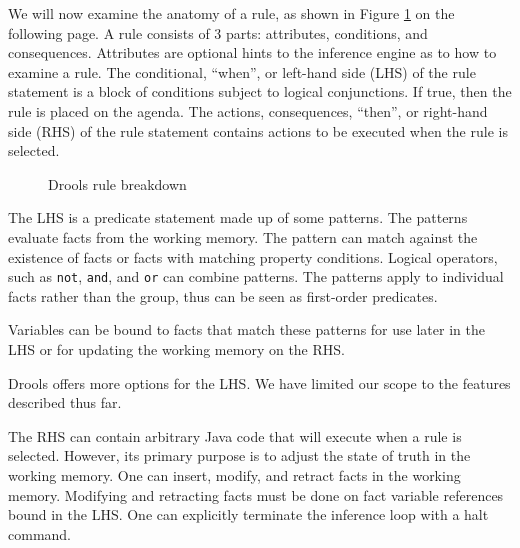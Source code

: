 We will now examine the anatomy of a rule, as shown in Figure \ref{fig:Drools_Rule_Breakdown} on the following page.
A rule consists of 3 parts: attributes, conditions, and consequences.
Attributes are optional hints to the inference engine as to how to examine a rule.
The conditional, ``when'', or left-hand side (LHS) of the rule statement is a block of conditions subject to logical conjunctions. 
If true, then the rule is placed on the agenda.
The actions, consequences, ``then'', or right-hand side (RHS) of the rule statement contains actions to be executed when the rule is selected.

\begin{figure}[h]
    \centering
    \caption{Drools rule breakdown}
    \label{fig:Drools_Rule_Breakdown}
\end{figure}

The LHS is a predicate statement made up of some patterns.
The patterns evaluate facts from the working memory.
The pattern can match against the existence of facts or facts with matching property conditions.
Logical operators, such as \texttt{not}, \texttt{and}, and \texttt{or} can combine patterns.
The patterns apply to individual facts rather than the group, thus can be seen as first-order predicates.

Variables can be bound to facts that match these patterns for use later in the LHS or for updating the working memory on the RHS.

Drools offers more options for the LHS.
We have limited our scope to the features described thus far.

The RHS can contain arbitrary Java code that will execute when a rule is selected.
However, its primary purpose is to adjust the state of truth in the working memory.
One can insert, modify, and retract facts in the working memory.
Modifying and retracting facts must be done on fact variable references bound in the LHS.
One can explicitly terminate the inference loop with a halt command.



